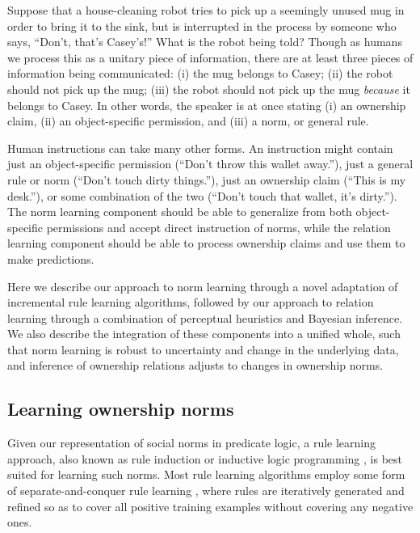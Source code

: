 \documentclass[letterpaper]{article} %
\begin{document}
Suppose that a house-cleaning robot tries to pick up a seemingly unused mug in order to bring it to the sink, but is interrupted in the process by someone who says, ``Don't, that's Casey's!'' What is the robot being told? Though as humans we process this as a unitary piece of information, there are at least three pieces of information being communicated: (i) the mug belongs to Casey; (ii) the robot should not pick up the mug; (iii) the robot should not pick up the mug \emph{because} it belongs to Casey. In other words, the speaker is at once stating (i) an ownership claim, (ii) an object-specific permission, and (iii) a norm, or general rule.

Human instructions can take many other forms. An instruction might contain just an object-specific permission (``Don't throw this wallet away.''), just a general rule or norm (``Don't touch dirty things.''), just an ownership claim (``This is my desk.''), or some combination of the two (``Don't touch that wallet, it's dirty.''). The norm learning component should be able to generalize from both object-specific permissions and accept direct instruction of norms, while the relation learning component should be able to process ownership claims and use them to make predictions.

Here we describe our approach to norm learning through a novel adaptation of incremental rule learning algorithms, followed by our approach to relation learning through a combination of perceptual heuristics and Bayesian inference. We also describe the integration of these components into a unified whole, such that norm learning is robust to uncertainty and change in the underlying data, and inference of ownership relations adjusts to changes in ownership norms.

\subsection{Learning ownership norms}

Given our representation of social norms in predicate logic, a rule learning approach, also known as rule induction \cite{clark1991rule} or inductive logic programming \cite{muggleton1991inductive}, is best suited for learning such norms. Most rule learning algorithms employ some form of separate-and-conquer rule learning \cite{furnkranz1999separate}, where rules are iteratively generated and refined so as to cover all positive training examples without covering any negative ones.
\end{document}
